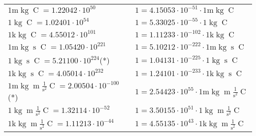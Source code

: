 \begin{center}
\begin{longtable}{l l}
{\color{gray}$1 \bm{\mathrm{ m}}\operatorname{kg}{}{}{\operatorname{C}}{} = 1.22042\cdot10^{50} $}   & {\color{gray}$ 1 = 4.15053\cdot10^{-51} \cdot 1 \bm{\mathrm{ m}}\operatorname{kg}{}{}{\operatorname{C}}{}$}  \\
{\color{black}$1 \bm{\mathrm{ }}\operatorname{kg}{}{}{\operatorname{C}}{} = 1.02401\cdot10^{54} $}   & {\color{black}$ 1 = 5.33025\cdot10^{-55} \cdot 1 \bm{\mathrm{ }}\operatorname{kg}{}{}{\operatorname{C}}{}$}  \\
{\color{gray}$1 \bm{\mathrm{ k}}\operatorname{kg}{}{}{\operatorname{C}}{} = 4.55012\cdot10^{101} $}   & {\color{gray}$ 1 = 1.11233\cdot10^{-102} \cdot 1 \bm{\mathrm{ k}}\operatorname{kg}{}{}{\operatorname{C}}{}$}  \\
{\color{gray}$1 \bm{\mathrm{ m}}\operatorname{kg}{}{\operatorname{s}}{\operatorname{C}}{} = 1.05420\cdot10^{221} $}   & {\color{gray}$ 1 = 5.10212\cdot10^{-222} \cdot 1 \bm{\mathrm{ m}}\operatorname{kg}{}{\operatorname{s}}{\operatorname{C}}{}$}  \\
{\color{black}$1 \bm{\mathrm{ }}\operatorname{kg}{}{\operatorname{s}}{\operatorname{C}}{} = 5.21100\cdot10^{224} $}\quad(*) & {\color{black}$ 1 = 1.04131\cdot10^{-225} \cdot 1 \bm{\mathrm{ }}\operatorname{kg}{}{\operatorname{s}}{\operatorname{C}}{}$}  \\
{\color{gray}$1 \bm{\mathrm{ k}}\operatorname{kg}{}{\operatorname{s}}{\operatorname{C}}{} = 4.05014\cdot10^{232} $}   & {\color{gray}$ 1 = 1.24101\cdot10^{-233} \cdot 1 \bm{\mathrm{ k}}\operatorname{kg}{}{\operatorname{s}}{\operatorname{C}}{}$}  \\
{\color{gray}$1 \bm{\mathrm{ m}}\operatorname{kg}{\operatorname{m}}\frac1{\operatorname{s}^2}{\operatorname{C}}{} = 2.00504\cdot10^{-100} $}\quad(*) & {\color{gray}$ 1 = 2.54423\cdot10^{55} \cdot 1 \bm{\mathrm{ m}}\operatorname{kg}{\operatorname{m}}\frac1{\operatorname{s}^2}{\operatorname{C}}{}$}  \\
{\color{black}$1 \bm{\mathrm{ }}\operatorname{kg}{\operatorname{m}}\frac1{\operatorname{s}^2}{\operatorname{C}}{} = 1.32114\cdot10^{-52} $}   & {\color{black}$ 1 = 3.50155\cdot10^{51} \cdot 1 \bm{\mathrm{ }}\operatorname{kg}{\operatorname{m}}\frac1{\operatorname{s}^2}{\operatorname{C}}{}$}  \\
{\color{gray}$1 \bm{\mathrm{ k}}\operatorname{kg}{\operatorname{m}}\frac1{\operatorname{s}^2}{\operatorname{C}}{} = 1.11213\cdot10^{-44} $}   & {\color{gray}$ 1 = 4.55135\cdot10^{43} \cdot 1 \bm{\mathrm{ k}}\operatorname{kg}{\operatorname{m}}\frac1{\operatorname{s}^2}{\operatorname{C}}{}$}  \\

\end{longtable}
\end{center}

